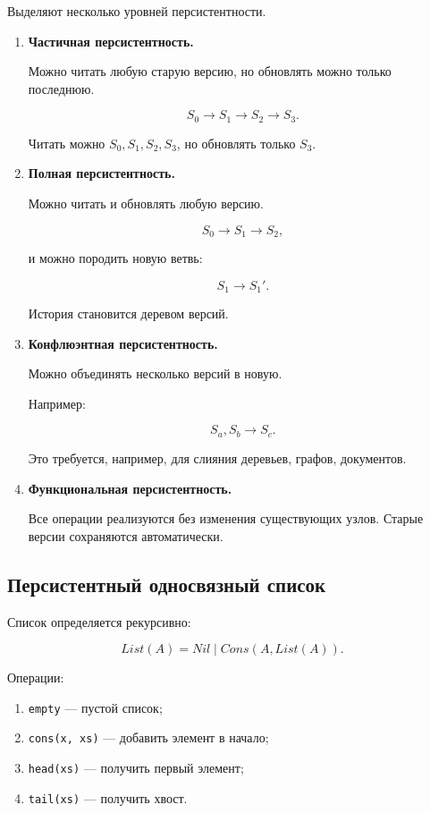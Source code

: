 \documentclass[12pt,a4paper]{article}
\begin{document}
Выделяют несколько уровней персистентности.

\begin{enumerate}
  \item \textbf{Частичная персистентность.}

  Можно читать любую старую версию, но обновлять можно только последнюю.

  \[
  S_0 \to S_1 \to S_2 \to S_3.
  \]

  Читать можно $S_0,S_1,S_2,S_3$, но обновлять только $S_3$.

  \item \textbf{Полная персистентность.}

  Можно читать и обновлять любую версию.

  \[
  S_0 \to S_1 \to S_2,
  \]

  и можно породить новую ветвь:

  \[
  S_1 \to S_1'.
  \]

  История становится деревом версий.

  \item \textbf{Конфлюэнтная персистентность.}

  Можно объединять несколько версий в новую.

  Например:

  \[
  S_a, S_b \to S_c.
  \]

  Это требуется, например, для слияния деревьев, графов, документов.

  \item \textbf{Функциональная персистентность.}

  Все операции реализуются без изменения существующих узлов. Старые версии сохраняются автоматически.
\end{enumerate}

\subsection{Персистентный односвязный список}

Список определяется рекурсивно:

\[
List(A) = Nil \mid Cons(A, List(A)).
\]

Операции:

\begin{enumerate}
  \item \texttt{empty} --- пустой список;
  \item \texttt{cons(x, xs)} --- добавить элемент в начало;
  \item \texttt{head(xs)} --- получить первый элемент;
  \item \texttt{tail(xs)} --- получить хвост.
\end{enumerate}
\end{document}
